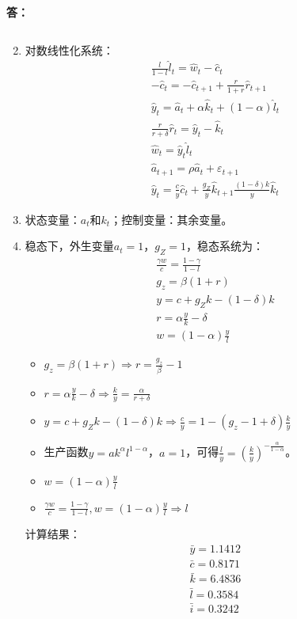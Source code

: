 \documentclass[12pt, a4paper, oneside]{article}
\newcounter{answername}
\newenvironment{answer}{\stepcounter{answername}\par\noindent\textbf{答：}}{\par}
\begin{document}
\begin{CJK*}{UTF8}{gbsn}
\begin{answer}
\begin{enumerate}
$$			$$
		\item 对数线性化系统：
			$$
			\begin{array}{c}\frac{l}{1-l} \hat{l}_{t}=\hat{w}_{t}-\hat{c}_{t} \\ -\hat{c}_{t}=-\hat{c}_{t+1}+\frac{r}{1+r} \hat{r}_{t+1} \\ \hat{y}_{t}=\hat{a}_{t}+\alpha \hat{k}_{t}+(1-\alpha) \hat{l}_{t} \\ \frac{r}{r+\delta} \hat{r}_{t}=\hat{y}_{t}-\hat{k}_{t} \\ \hat{w}_{t}=\hat{y}_{t} \hat{l}_{t} \\ \hat{a}_{t+1}=\rho \hat{a}_{t}+\varepsilon_{t+1} \\ \hat{y}_{t}=\frac{c}{y} \hat{c}_{t}+\frac{g_{Z}}{y} \hat{k}_{t+1} \frac{(1-\delta) k}{y} \hat{k}_{t}\end{array}
			$$
		\item 状态变量：$a_t$和$k_t$；控制变量：其余变量。
		\item 稳态下，外生变量$a_t=1$，$g_Z=1$，稳态系统为：
			$$
			\begin{array}{c}\frac{\gamma w}{c}=\frac{1-\gamma}{1-l} \\ g_{z}=\beta(1+r) \\ y=c+g_{Z} k-(1-\delta) k \\ r=\alpha \frac{y}{k}-\delta \\ w=(1-\alpha) \frac{y}{l}\end{array}
			$$
			\begin{itemize}
				\item $g_{z}=\beta(1+r)\Rightarrow r=\frac{g_{z}}{\beta}-1$
				\item $r=\alpha \frac{y}{k}-\delta \Rightarrow \frac{k}{y}=\frac{\alpha}{r+\delta}$
				\item $y=c+g_{Z} k-(1-\delta) k\Rightarrow\frac{c}{y}=1-\left(g_{z}-1+\delta\right) \frac{k}{y}$
				\item 生产函数$y=a k^{\alpha} l^{1-\alpha}$，$a=1$，可得$\frac{l}{y}=\left(\frac{k}{y}\right)^{-\frac{\alpha}{1-\alpha}}$。
				\item $w=(1-\alpha) \frac{y}{l}$
				\item $\frac{\gamma w}{c}=\frac{1-\gamma}{1-l}, w=(1-\alpha) \frac{y}{l} \Rightarrow l$
			\end{itemize}
			计算结果：
			$$
			\begin{array}{l}\bar{y}=1.1412 \\ \bar{c}=0.8171 \\ \bar{k}=6.4836 \\ \bar{l}=0.3584 \\ \bar{i}=0.3242\end{array}
$$
\end{enumerate}
\end{answer}
\end{CJK*}
\end{document}
